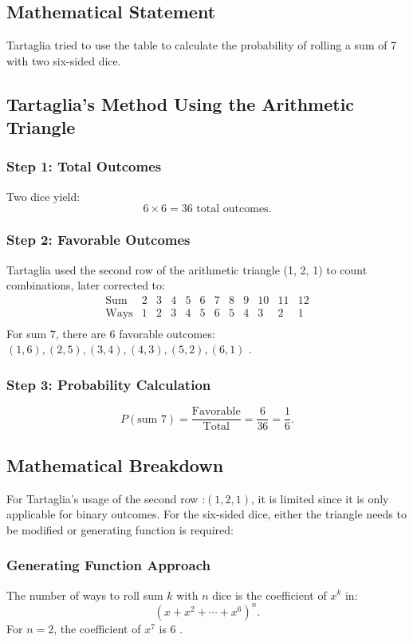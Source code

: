 \documentclass{article}
\begin{document}
\subsection{Mathematical Statement}

Tartaglia tried to use the table to calculate the probability of rolling a sum of 7 with two six-sided dice.

\subsection{Tartaglia's Method Using the Arithmetic Triangle}
\subsubsection{Step 1: Total Outcomes}
Two dice yield:
\[
6 \times 6 = 36 \text{ total outcomes}.
\]

\subsubsection{Step 2: Favorable Outcomes}
Tartaglia used the second row of the arithmetic triangle (1, 2, 1) to count combinations, later corrected to:
\[
\begin{array}{cccccccccccc}
\text{Sum} & 2 & 3 & 4 & 5 & 6 & 7 & 8 & 9 & 10 & 11 & 12 \\
\text{Ways} & 1 & 2 & 3 & 4 & 5 & 6 & 5 & 4 & 3 & 2 & 1 \\
\end{array}
\]
For sum \(7\), there are 6 favorable outcomes: \((1,6), (2,5), (3,4), (4,3), (5,2), (6,1)\) \citep{hald1990}.

\subsubsection{Step 3: Probability Calculation}
\[
P(\text{sum } 7) = \frac{\text{Favorable}}{\text{Total}} = \frac{6}{36} = \frac{1}{6}.
\]

\subsection{Mathematical Breakdown}

For Tartaglia's usage of the second row :\((1,2,1)\), it is limited since it is only applicable for binary outcomes. For the six-sided dice, either the triangle needs to be modified or generating function is required:

\subsubsection{Generating Function Approach}
The number of ways to roll sum \(k\) with \(n\) dice is the coefficient of \(x^k\) in:
\[
(x + x^2 + \cdots + x^6)^n.
\]
For \(n = 2\), the coefficient of \(x^7\) is 6 \citep{pascal1654}.
\end{document}
